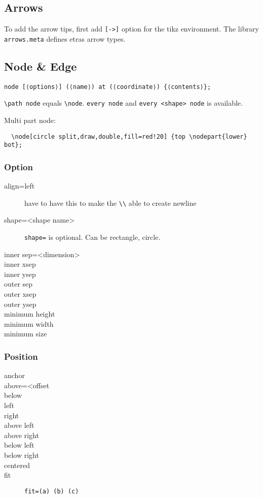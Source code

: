 \subsection{Arrows}
To add the arrow tips, first add \texttt{[->]} option for the tikz
environment.  The library \texttt{arrows.meta} defines etras arrow
types.


\subsection{Node \& Edge}

\begin{lstlisting}
node [⟨options⟩] (⟨name⟩) at (⟨coordinate⟩) {⟨contents⟩};
\end{lstlisting}

\verb$\path node$ equals \verb$\node$. \texttt{every node} and
\texttt{every <shape> node} is available.

Multi part node:
\begin{lstlisting}
  \node[circle split,draw,double,fill=red!20] {top \nodepart{lower} bot};
\end{lstlisting}

\subsubsection{Option}
\begin{description}
\item [align=left] have to have this to make the \verb$\\$ able to create
  newline
\item [shape=<shape name>] \texttt{shape=} is optional. Can be
  rectangle, circle.
\item [inner sep=<dimension>]
\item [inner xsep]
\item [inner ysep]
\item [outer sep]
\item [outer xsep]
\item [outer ysep]
\item [minimum height]
\item [minimum width]
\item [minimum size]
\end{description}


\subsubsection{Position}
\begin{description}
\item [anchor]
\item [above=<offset]
\item [below]
\item [left]
\item [right]
\item [above left]
\item [above right]
\item [below left]
\item [below right]
\item [centered]
\item [fit] \texttt{fit=(a) (b) (c)}
\end{description}

